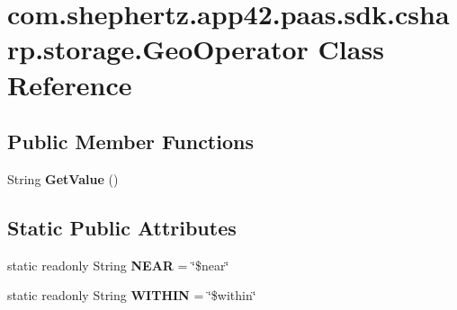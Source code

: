 \hypertarget{classcom_1_1shephertz_1_1app42_1_1paas_1_1sdk_1_1csharp_1_1storage_1_1_geo_operator}{\section{com.\+shephertz.\+app42.\+paas.\+sdk.\+csharp.\+storage.\+Geo\+Operator Class Reference}
\label{classcom_1_1shephertz_1_1app42_1_1paas_1_1sdk_1_1csharp_1_1storage_1_1_geo_operator}
}
\subsection*{Public Member Functions}
\begin{DoxyCompactItemize}
\item 
\hypertarget{classcom_1_1shephertz_1_1app42_1_1paas_1_1sdk_1_1csharp_1_1storage_1_1_geo_operator_a526d50bff6490625b910009926e7f595}{String {\bfseries Get\+Value} ()}\label{classcom_1_1shephertz_1_1app42_1_1paas_1_1sdk_1_1csharp_1_1storage_1_1_geo_operator_a526d50bff6490625b910009926e7f595}

\end{DoxyCompactItemize}
\subsection*{Static Public Attributes}
\begin{DoxyCompactItemize}
\item 
\hypertarget{classcom_1_1shephertz_1_1app42_1_1paas_1_1sdk_1_1csharp_1_1storage_1_1_geo_operator_ab45bf8aa4a8d3adb4e8814cb9a945194}{static readonly String {\bfseries N\+E\+A\+R} = \char`\"{}\$near\char`\"{}}\label{classcom_1_1shephertz_1_1app42_1_1paas_1_1sdk_1_1csharp_1_1storage_1_1_geo_operator_ab45bf8aa4a8d3adb4e8814cb9a945194}

\item 
\hypertarget{classcom_1_1shephertz_1_1app42_1_1paas_1_1sdk_1_1csharp_1_1storage_1_1_geo_operator_ad96cee4068fce0e677b8151f01bb128e}{static readonly String {\bfseries W\+I\+T\+H\+I\+N} = \char`\"{}\$within\char`\"{}}\label{classcom_1_1shephertz_1_1app42_1_1paas_1_1sdk_1_1csharp_1_1storage_1_1_geo_operator_ad96cee4068fce0e677b8151f01bb128e}

\end{DoxyCompactItemize}
